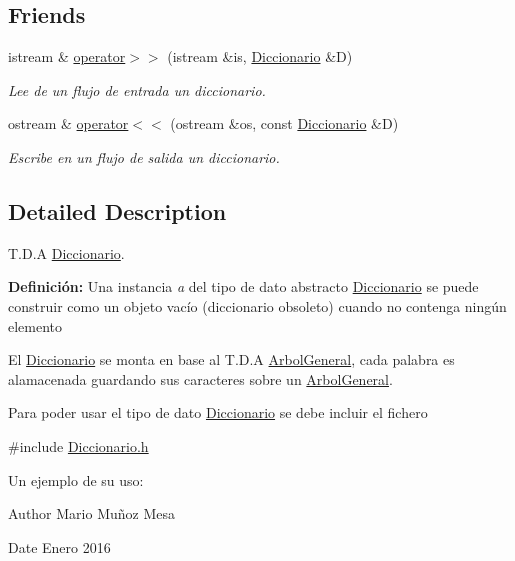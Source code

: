\subsection*{Friends}
\begin{DoxyCompactItemize}
\item 
istream \& \hyperlink{classDiccionario_a940c6d9371bca891c95a5a044a42905f}{operator$>$$>$} (istream \&is, \hyperlink{classDiccionario}{Diccionario} \&D)
\begin{DoxyCompactList}\small\item\em Lee de un flujo de entrada un diccionario. \end{DoxyCompactList}\item 
ostream \& \hyperlink{classDiccionario_aad8d25118e38f63c35cfc247af45a78a}{operator$<$$<$} (ostream \&os, const \hyperlink{classDiccionario}{Diccionario} \&D)
\begin{DoxyCompactList}\small\item\em Escribe en un flujo de salida un diccionario. \end{DoxyCompactList}\end{DoxyCompactItemize}


\subsection{Detailed Description}
T.\-D.\-A \hyperlink{classDiccionario}{Diccionario}. 

{\bfseries Definición\-:} Una instancia {\itshape a} del tipo de dato abstracto \hyperlink{classDiccionario}{Diccionario} se puede construir como un objeto vacío (diccionario obsoleto) cuando no contenga ningún elemento

El \hyperlink{classDiccionario}{Diccionario} se monta en base al T.\-D.\-A \hyperlink{classArbolGeneral}{Arbol\-General}, cada palabra es alamacenada guardando sus caracteres sobre un \hyperlink{classArbolGeneral}{Arbol\-General}.

Para poder usar el tipo de dato \hyperlink{classDiccionario}{Diccionario} se debe incluir el fichero

{\ttfamily \#include \hyperlink{Diccionario_8h}{Diccionario.\-h}}

Un ejemplo de su uso\-: 
\begin{DoxyCodeInclude}
\end{DoxyCodeInclude}


\begin{DoxyAuthor}{Author}
Mario Muñoz Mesa 
\end{DoxyAuthor}
\begin{DoxyDate}{Date}
Enero 2016 
\end{DoxyDate}


